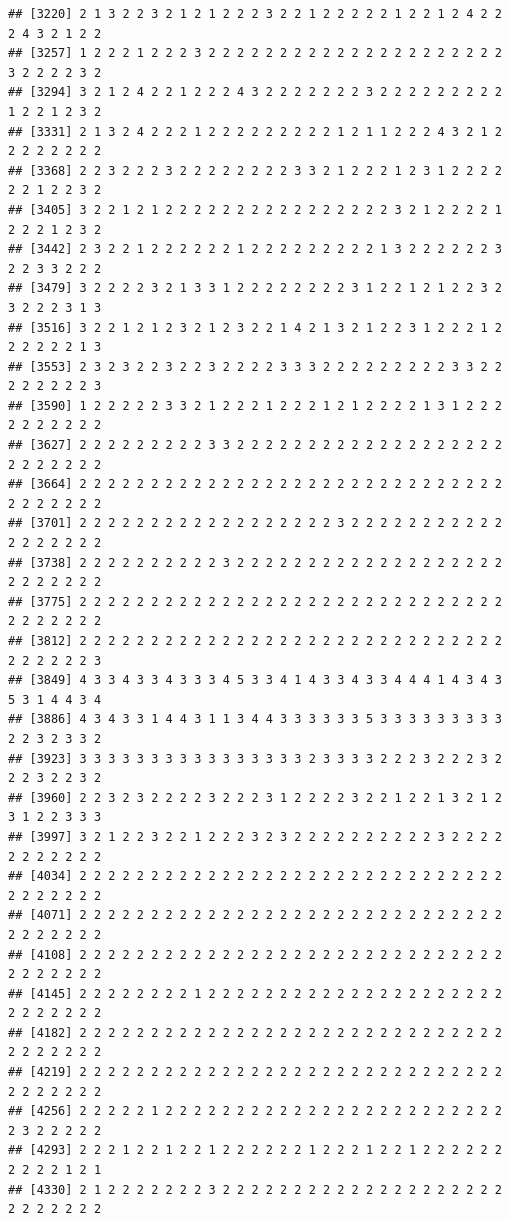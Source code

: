 \documentclass[
]{article}
\begin{document}
\begin{verbatim}
## [3220] 2 1 3 2 2 3 2 1 2 1 2 2 2 3 2 2 1 2 2 2 2 2 1 2 2 1 2 4 2 2 2 4 3 2 1 2 2
## [3257] 1 2 2 2 1 2 2 2 3 2 2 2 2 2 2 2 2 2 2 2 2 2 2 2 2 2 2 2 2 2 3 2 2 2 2 3 2
## [3294] 3 2 1 2 4 2 2 1 2 2 2 4 3 2 2 2 2 2 2 2 3 2 2 2 2 2 2 2 2 2 1 2 2 1 2 3 2
## [3331] 2 1 3 2 4 2 2 2 1 2 2 2 2 2 2 2 2 2 1 2 1 1 2 2 2 4 3 2 1 2 2 2 2 2 2 2 2
## [3368] 2 2 3 2 2 2 3 2 2 2 2 2 2 2 2 3 3 2 1 2 2 2 1 2 3 1 2 2 2 2 2 2 1 2 2 3 2
## [3405] 3 2 2 1 2 1 2 2 2 2 2 2 2 2 2 2 2 2 2 2 2 2 3 2 1 2 2 2 2 1 2 2 2 1 2 3 2
## [3442] 2 3 2 2 1 2 2 2 2 2 2 1 2 2 2 2 2 2 2 2 2 1 3 2 2 2 2 2 2 3 2 2 3 3 2 2 2
## [3479] 3 2 2 2 2 3 2 1 3 3 1 2 2 2 2 2 2 2 2 3 1 2 2 1 2 1 2 2 3 2 3 2 2 2 3 1 3
## [3516] 3 2 2 1 2 1 2 3 2 1 2 3 2 2 1 4 2 1 3 2 1 2 2 3 1 2 2 2 1 2 2 2 2 2 2 1 3
## [3553] 2 3 2 3 2 2 3 2 2 3 2 2 2 2 3 3 3 2 2 2 2 2 2 2 2 2 3 3 2 2 2 2 2 2 2 2 3
## [3590] 1 2 2 2 2 2 3 3 2 1 2 2 2 1 2 2 2 1 2 1 2 2 2 2 1 3 1 2 2 2 2 2 2 2 2 2 2
## [3627] 2 2 2 2 2 2 2 2 2 3 3 2 2 2 2 2 2 2 2 2 2 2 2 2 2 2 2 2 2 2 2 2 2 2 2 2 2
## [3664] 2 2 2 2 2 2 2 2 2 2 2 2 2 2 2 2 2 2 2 2 2 2 2 2 2 2 2 2 2 2 2 2 2 2 2 2 2
## [3701] 2 2 2 2 2 2 2 2 2 2 2 2 2 2 2 2 2 2 3 2 2 2 2 2 2 2 2 2 2 2 2 2 2 2 2 2 2
## [3738] 2 2 2 2 2 2 2 2 2 2 3 2 2 2 2 2 2 2 2 2 2 2 2 2 2 2 2 2 2 2 2 2 2 2 2 2 2
## [3775] 2 2 2 2 2 2 2 2 2 2 2 2 2 2 2 2 2 2 2 2 2 2 2 2 2 2 2 2 2 2 2 2 2 2 2 2 2
## [3812] 2 2 2 2 2 2 2 2 2 2 2 2 2 2 2 2 2 2 2 2 2 2 2 2 2 2 2 2 2 2 2 2 2 2 2 2 3
## [3849] 4 3 3 4 3 3 4 3 3 3 4 5 3 3 4 1 4 3 3 4 3 3 4 4 4 1 4 3 4 3 5 3 1 4 4 3 4
## [3886] 4 3 4 3 3 1 4 4 3 1 1 3 4 4 3 3 3 3 3 3 5 3 3 3 3 3 3 3 3 3 2 2 3 2 3 3 2
## [3923] 3 3 3 3 3 3 3 3 3 3 3 3 3 3 3 3 2 3 3 3 3 2 2 2 3 2 2 2 3 2 2 2 3 2 2 3 2
## [3960] 2 2 3 2 3 2 2 2 2 3 2 2 2 3 1 2 2 2 2 3 2 2 1 2 2 1 3 2 1 2 3 1 2 2 3 3 3
## [3997] 3 2 1 2 2 3 2 2 1 2 2 2 3 2 3 2 2 2 2 2 2 2 2 2 2 3 2 2 2 2 2 2 2 2 2 2 2
## [4034] 2 2 2 2 2 2 2 2 2 2 2 2 2 2 2 2 2 2 2 2 2 2 2 2 2 2 2 2 2 2 2 2 2 2 2 2 2
## [4071] 2 2 2 2 2 2 2 2 2 2 2 2 2 2 2 2 2 2 2 2 2 2 2 2 2 2 2 2 2 2 2 2 2 2 2 2 2
## [4108] 2 2 2 2 2 2 2 2 2 2 2 2 2 2 2 2 2 2 2 2 2 2 2 2 2 2 2 2 2 2 2 2 2 2 2 2 2
## [4145] 2 2 2 2 2 2 2 2 1 2 2 2 2 2 2 2 2 2 2 2 2 2 2 2 2 2 2 2 2 2 2 2 2 2 2 2 2
## [4182] 2 2 2 2 2 2 2 2 2 2 2 2 2 2 2 2 2 2 2 2 2 2 2 2 2 2 2 2 2 2 2 2 2 2 2 2 2
## [4219] 2 2 2 2 2 2 2 2 2 2 2 2 2 2 2 2 2 2 2 2 2 2 2 2 2 2 2 2 2 2 2 2 2 2 2 2 2
## [4256] 2 2 2 2 2 1 2 2 2 2 2 2 2 2 2 2 2 2 2 2 2 2 2 2 2 2 2 2 2 2 2 3 2 2 2 2 2
## [4293] 2 2 2 1 2 2 1 2 2 1 2 2 2 2 2 2 1 2 2 2 1 2 2 1 2 2 2 2 2 2 2 2 2 2 1 2 1
## [4330] 2 1 2 2 2 2 2 2 2 3 2 2 2 2 2 2 2 2 2 2 2 2 2 2 2 2 2 2 2 2 2 2 2 2 2 2 2

\end{verbatim}
\end{document}
